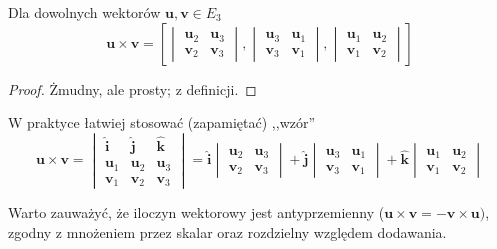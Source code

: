 \begin{theorem}
    Dla dowolnych wektorów $\mathbf{u}, \mathbf{v} \in E_3$
    \[ \mathbf{u} \times \mathbf{v} = \left[\begin{vmatrix}
        \mathbf{u}_2 & \mathbf{u}_3 \\
        \mathbf{v}_2 & \mathbf{v}_3
    \end{vmatrix}, \begin{vmatrix}
        \mathbf{u}_3 & \mathbf{u}_1 \\
        \mathbf{v}_3 & \mathbf{v}_1
    \end{vmatrix}, \begin{vmatrix}
        \mathbf{u}_1 & \mathbf{u}_2 \\
        \mathbf{v}_1 & \mathbf{v}_2
    \end{vmatrix}\right]\]
\end{theorem}
\begin{proof}
    Żmudny, ale prosty; z definicji.
\end{proof}

W praktyce łatwiej stosować (zapamiętać) ,,wzór''
\begin{equation} \label{eq:easy cross product}
    \mathbf{u} \times \mathbf{v} = \begin{vmatrix}
        \mathbf{\hat{i}} & \mathbf{\hat{j}} & \mathbf{\hat{k}} \\
        \mathbf{u}_1 & \mathbf{u}_2 & \mathbf{u}_3 \\
        \mathbf{v}_1 & \mathbf{v}_2 & \mathbf{v}_3
    \end{vmatrix} = \mathbf{\hat{i}}\begin{vmatrix}
        \mathbf{u}_2 & \mathbf{u}_3 \\
        \mathbf{v}_2 & \mathbf{v}_3
    \end{vmatrix} + \mathbf{\hat{j}}\begin{vmatrix}
        \mathbf{u}_3 & \mathbf{u}_1 \\
        \mathbf{v}_3 & \mathbf{v}_1
    \end{vmatrix} + \mathbf{\hat{k}}\begin{vmatrix}
        \mathbf{u}_1 & \mathbf{u}_2 \\
        \mathbf{v}_1 & \mathbf{v}_2
    \end{vmatrix}
\end{equation}

Warto zauważyć, że iloczyn wektorowy jest antyprzemienny ($\mathbf{u} \times \mathbf{v} = -\mathbf{v} \times \mathbf{u})$, zgodny z mnożeniem przez skalar oraz rozdzielny względem dodawania.

